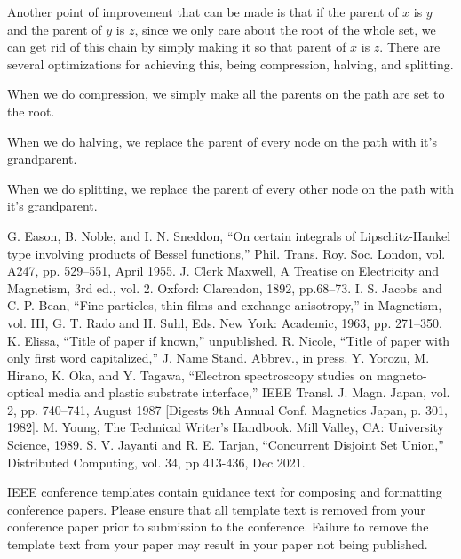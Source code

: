 \documentclass[conference]{IEEEtran}
\begin{document}


Another point of improvement that can be made is that if the parent of $x$ is $y$ and the parent of $y$ is $z$, since we only care about the root of the whole set, we can get rid of this chain by simply making it so that parent of $x$ is $z$. There are several optimizations for achieving this, being compression, halving, and splitting.

When we do compression, we simply make all the parents on the path are set to the root.



When we do halving, we replace the parent of every node on the path with it's grandparent.



When we do splitting, we replace the parent of every other node on the path with it's grandparent.



\begin{thebibliography}{00}
 G. Eason, B. Noble, and I. N. Sneddon, ``On certain integrals of Lipschitz-Hankel type involving products of Bessel functions,'' Phil. Trans. Roy. Soc. London, vol. A247, pp. 529--551, April 1955.
 J. Clerk Maxwell, A Treatise on Electricity and Magnetism, 3rd ed., vol. 2. Oxford: Clarendon, 1892, pp.68--73.
 I. S. Jacobs and C. P. Bean, ``Fine particles, thin films and exchange anisotropy,'' in Magnetism, vol. III, G. T. Rado and H. Suhl, Eds. New York: Academic, 1963, pp. 271--350.
 K. Elissa, ``Title of paper if known,'' unpublished.
 R. Nicole, ``Title of paper with only first word capitalized,'' J. Name Stand. Abbrev., in press.
 Y. Yorozu, M. Hirano, K. Oka, and Y. Tagawa, ``Electron spectroscopy studies on magneto-optical media and plastic substrate interface,'' IEEE Transl. J. Magn. Japan, vol. 2, pp. 740--741, August 1987 [Digests 9th Annual Conf. Magnetics Japan, p. 301, 1982].
 M. Young, The Technical Writer's Handbook. Mill Valley, CA: University Science, 1989.
 S. V. Jayanti and R. E. Tarjan, ``Concurrent Disjoint Set Union,'' Distributed Computing, vol. 34, pp 413-436, Dec 2021.
\end{thebibliography}
\vspace{12pt}
\color{red}
IEEE conference templates contain guidance text for composing and formatting conference papers. Please ensure that all template text is removed from your conference paper prior to submission to the conference. Failure to remove the template text from your paper may result in your paper not being published.
\end{document}
